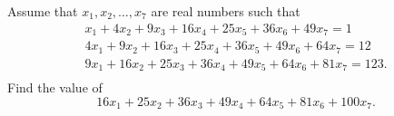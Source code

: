 Assume that $x_1,x_2,\ldots,x_7$ are real numbers such that
\[ \begin{array}{r} x_1+4x_2+9x_3+16x_4+25x_5+36x_6+49x_7=1\,\,\,\,\,\,\,\, \\ 4x_1+9x_2+16x_3+25x_4+36x_5+49x_6+64x_7=12\,\,\,\,\, \\ 9x_1+16x_2+25x_3+36x_4+49x_5+64x_6+81x_7=123. \\ \end{array}  \]Find the value of \[16x_1+25x_2+36x_3+49x_4+64x_5+81x_6+100x_7.\]